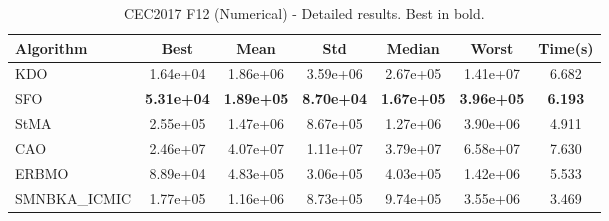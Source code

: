\begin{table}[H]
\centering\small
\caption{CEC2017 F12 (Numerical) - Detailed results. Best in bold.}
\label{tab:cec2017_F12}
\begin{tabular}{lcccccc}
\toprule
\textbf{Algorithm} & \textbf{Best} & \textbf{Mean} & \textbf{Std} & \textbf{Median} & \textbf{Worst} & \textbf{Time(s)} \\
\midrule
KDO & 1.64e+04 & 1.86e+06 & 3.59e+06 & 2.67e+05 & 1.41e+07 & 6.682 \\
SFO & \textbf{5.31e+04} & \textbf{1.89e+05} & \textbf{8.70e+04} & \textbf{1.67e+05} & \textbf{3.96e+05} & \textbf{6.193} \\
StMA & 2.55e+05 & 1.47e+06 & 8.67e+05 & 1.27e+06 & 3.90e+06 & 4.911 \\
CAO & 2.46e+07 & 4.07e+07 & 1.11e+07 & 3.79e+07 & 6.58e+07 & 7.630 \\
ERBMO & 8.89e+04 & 4.83e+05 & 3.06e+05 & 4.03e+05 & 1.42e+06 & 5.533 \\
SMNBKA_ICMIC & 1.77e+05 & 1.16e+06 & 8.73e+05 & 9.74e+05 & 3.55e+06 & 3.469 \\
\bottomrule
\end{tabular}
\end{table}
